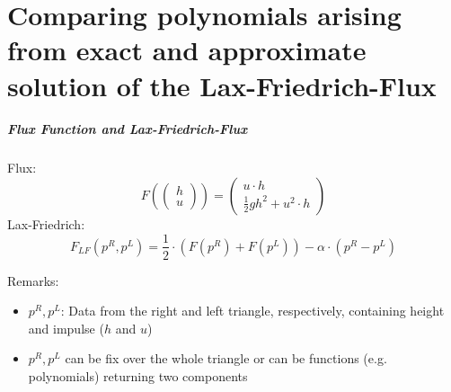 \documentclass{beamer}
\begin{document}
\part{Comparing polynomials arising from exact and approximate solution of the Lax-Friedrich-Flux}
\label{part:polynomialstuff}

\begin{frame}
  \frametitle{Flux Function and Lax-Friedrich-Flux}
  Flux:
  \begin{equation}
    \label{eq:flux-function-definition}
    F\left(
      \begin{pmatrix}
        h \\ u
      \end{pmatrix}
    \right) = 
    \begin{pmatrix}
      u \cdot h \\
      \frac{1}{2} g h^2 + u^2 \cdot h
    \end{pmatrix}
  \end{equation}
  Lax-Friedrich:
  \begin{equation}
    \label{eq:lax-friedrich-definition}
    F_{LF}(p^R,p^L) = \dfrac{1}{2}\cdot (F(p^R) + F(p^L)) - \alpha \cdot (p^R - p^L)
  \end{equation}
  \begin{block}{Remarks:}
    \begin{itemize}
    \item $p^R, p^L$: Data from the right and left triangle, respectively, containing height and impulse ($h$ and $u$)
    \item $p^R, p^L$ can be fix over the whole triangle or can be functions (e.g. polynomials) returning two components
    \end{itemize}
  \end{block}
\end{frame}
\end{document}
